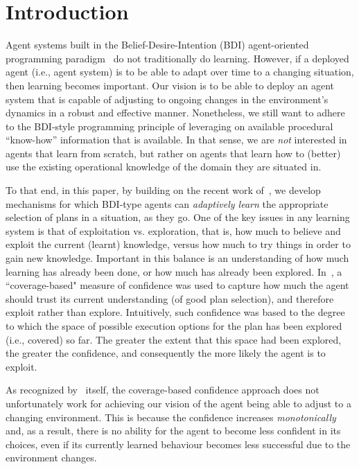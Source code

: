 \section{Introduction}\label{sec:introduction}

Agent systems built in the Belief-Desire-Intention (BDI) agent-oriented programming paradigm~\cite{Georgeff89-PRS,Rao96:AgentSpeak,WooldridgeBook} do not traditionally do learning. 
However, if a deployed agent (i.e., agent system) is to be able to adapt over time to a changing situation, then learning becomes important. Our vision is to be able to deploy an agent system that is capable of adjusting to ongoing changes in the environment's dynamics in a robust and effective manner. Nonetheless, we still want to adhere to the BDI-style programming principle of leveraging on available procedural ``know-how'' information that is available. In that sense, we are \emph{not} interested in agents that learn from scratch, but rather on agents that learn how to (better) use the existing operational knowledge of the domain they are situated in. 



To that end, in this paper, by building on the recent work of~\cite{airiau09:enhancing,singh10:extending,singh10:learning}, we develop mechanisms for which BDI-type agents can \emph{adaptively learn} the appropriate selection of plans in a situation, as they go. 
One of the key issues in any learning system is that of exploitation vs. exploration, that is, how much to believe and exploit the current (learnt) knowledge, versus how much to try things in order to gain new knowledge. Important in this balance is an understanding of how much learning has already been done, or how much has already been explored. In~\cite{singh10:extending,singh10:learning}, a ``coverage-based" measure of confidence was used to capture how much the agent should trust its current understanding (of good plan selection), and therefore exploit rather than explore. Intuitively, such confidence was based to the degree to which the space of possible execution options for the plan has been explored (i.e., covered) so far. The greater the extent that this space had been explored, the greater the confidence, and consequently the more likely the agent is to exploit.  

As recognized by~\cite{singh10:learning} itself, the coverage-based confidence approach does not unfortunately work for achieving our vision of the agent being able to adjust to a changing environment. This is because  the confidence increases \emph{monotonically} and, as a result, there is no ability for the agent to become less confident in its choices, even if its currently learned behaviour becomes less successful due to the environment changes.



